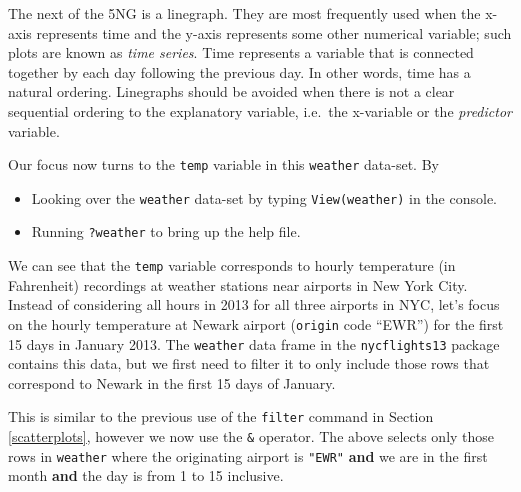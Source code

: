 \documentclass[12pt,]{krantz}
\makeatletter
\newenvironment{Shaded}{\begin{snugshade}}{\end{snugshade}}
\newcommand{\KeywordTok}[1]{\textcolor[rgb]{0.27,0.27,0.27}{\textbf{#1}}}
\newcommand{\DecValTok}[1]{\textcolor[rgb]{0.06,0.06,0.06}{#1}}
\newcommand{\StringTok}[1]{\textcolor[rgb]{0.5,0.5,0.5}{#1}}
\newcommand{\OperatorTok}[1]{\textcolor[rgb]{0.43,0.43,0.43}{\textbf{#1}}}
\newcommand{\NormalTok}[1]{#1}
\providecommand{\tightlist}{%
  \setlength{\itemsep}{0pt}\setlength{\parskip}{0pt}}
\newenvironment{kframe}{%
\medskip{}
\setlength{\fboxsep}{.8em}
 \def\at@end@of@kframe{}%
 \ifinner\ifhmode%
  \def\at@end@of@kframe{\end{minipage}}%
  \begin{minipage}{\columnwidth}%
 \fi\fi%
 \def\FrameCommand##1{\hskip\@totalleftmargin \hskip-\fboxsep
 \colorbox{shadecolor}{##1}\hskip-\fboxsep
     \hskip-\linewidth \hskip-\@totalleftmargin \hskip\columnwidth}%
 \MakeFramed {\advance\hsize-\width
   \@totalleftmargin\z@ \linewidth\hsize
   \@setminipage}}%
 {\par\unskip\endMakeFramed%
 \at@end@of@kframe}
\renewenvironment{Shaded}{\begin{kframe}}{\end{kframe}}
\makeatother
\begin{document}
The next of the 5NG is a linegraph. They are most frequently used when
the x-axis represents time and the y-axis represents some other
numerical variable; such plots are known as \emph{time series}. Time
represents a variable that is connected together by each day following
the previous day. In other words, time has a natural ordering.
Linegraphs should be avoided when there is not a clear sequential
ordering to the explanatory variable, i.e.~the x-variable or the
\emph{predictor} variable.

Our focus now turns to the \texttt{temp} variable in this
\texttt{weather} data-set. By

\begin{itemize}
\tightlist
\item
  Looking over the \texttt{weather} data-set by typing
  \texttt{View(weather)} in the console.
\item
  Running \texttt{?weather} to bring up the help file.
\end{itemize}

We can see that the \texttt{temp} variable corresponds to hourly
temperature (in Fahrenheit) recordings at weather stations near airports
in New York City. Instead of considering all hours in 2013 for all three
airports in NYC, let's focus on the hourly temperature at Newark airport
(\texttt{origin} code ``EWR'') for the first 15 days in January 2013.
The \texttt{weather} data frame in the \texttt{nycflights13} package
contains this data, but we first need to filter it to only include those
rows that correspond to Newark in the first 15 days of January.

\begin{Shaded}
\end{Shaded}

This is similar to the previous use of the \texttt{filter} command in
Section \ref{scatterplots}, however we now use the \texttt{\&} operator.
The above selects only those rows in \texttt{weather} where the
originating airport is \texttt{"EWR"} \textbf{and} we are in the first
month \textbf{and} the day is from 1 to 15 inclusive.
\end{document}

